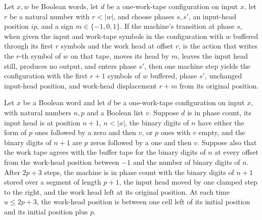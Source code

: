 \begin{theorem}
\label{Turing.inputLength_write}
\leanok
{}
Let $x,w$ be Boolean words, let $d$ be a one-work-tape configuration on input $x$, let
$r$ be a natural number with $r<|w|$, and choose phases $s,s'$, an input-head position
$ip$, and a sign $m\in\{-1,0,1\}$. If the machine’s transition at phase $s$, when given
the input and work-tape symbols in the configuration with $w$ buffered through its first
$r$ symbols and the work head at offset $r$, is the action that writes the $r$-th symbol
of $w$ on that tape, moves its head by $m$, leaves the input head still, produces no
output, and enters phase $s'$, then one machine step yields the configuration with the
first $r+1$ symbols of $w$ buffered, phase $s'$, unchanged input-head position, and
work-head displacement $r+m$ from its original position.
\end{theorem}

\begin{theorem}
\label{Turing.inputLength_round}
\leanok
{}
Let $x$ be a Boolean word and let $d$ be a one-work-tape configuration on input $x$,
with natural numbers $n,p$ and a Boolean list $v$. Suppose $d$ is in phase count, its
input head is at position $n+1$, $n<|x|$, the binary digits of $n$ have either the form
of $p$ ones followed by a zero and then $v$, or $p$ ones with $v$ empty, and the binary
digits of $n+1$ are $p$ zeros followed by a one and then $v$. Suppose also that the work
tape agrees with the buffer tape for the binary digits of $n$ at every offset from the
work-head position between $-1$ and the number of binary digits of $n$. After $2p+3$
steps, the machine is in phase count with the binary digits of $n+1$ stored over a
segment of length $p+1$, the input head moved by one clamped step to the right, and the
work head left at its original position. At each time $u\le 2p+3$, the work-head
position is between one cell left of its initial position and its initial position plus
$p$.
\end{theorem}

